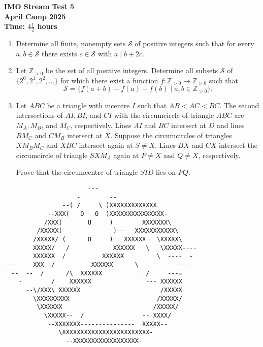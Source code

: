 \documentclass[12pt]{article}
\begin{document}
\thispagestyle{empty}

\begin{center}
  \bfseries
  \Large IMO Stream Test 5
  \\ \bigskip
  \large April Camp 2025
  \\ \bigskip
  Time: $4\frac{1}{2}$ hours
\end{center}

\bigskip\bigskip
\begin{enumerate}[leftmargin=0pt,itemsep=\bigskipamount]

\item Determine all finite, nonempty sets $\mathcal{S}$ of positive integers such that for every $a,b\in\mathcal{S}$ there exists $c\in\mathcal{S}$ with $a \mid b+ 2c$.

\item Let $\mathbb{Z}_{>0}$ be the set of all positive integers.
Determine all subsets $\mathcal{S}$ of $\{2^0, 2^1, 2^2, \dotsc\}$ for which there exist a function $f : \mathbb{Z}_{>0} \to \mathbb{Z}_{>0}$ such that
\[\mathcal{S} = \{f(a+b)-f(a)-f(b) \mid a,b\in\mathbb{Z}_{>0}\}.\]

\item 
Let $ABC$ be a triangle with incentre $I$ such that $AB<AC<BC$.
The second intersections of $AI, BI$, and $CI$ with the circumcircle of triangle $ABC$ are $M_A, M_B$, and $M_C$, respectively.
Lines $AI$ and $BC$ intersect at $D$ and lines $BM_C$ and $CM_B$ intersect at $X$.
Suppose the circumcircles of triangles $XM_BM_C$ and $XBC$ intersect again at $S\neq X$.
Lines $BX$ and $CX$ intersect the circumcircle of triangle $SXM_A$ again at $P\neq X$ and $Q\neq X$, respectively.

Prove that the circumcentre of triangle $SID$ lies on $PQ$.

\end{enumerate}


\vfill
\centering
\scriptsize %
\begin{BVerbatim}
                       ---                                     
                    -        --                             
                --( /     \ )XXXXXXXXXXXXX                   
            --XXX(   O   O  )XXXXXXXXXXXXXXX-              
           /XXX(       U     )        XXXXXXX\               
         /XXXXX(              )--   XXXXXXXXXXX\             
        /XXXXX/ (      O     )   XXXXXX   \XXXXX\
        XXXXX/   /            XXXXXX   \   \XXXXX----        
        XXXXXX  /          XXXXXX         \  ----  -         
---     XXX  /          XXXXXX      \           ---        
  --  --  /      /\  XXXXXX            /     ---=         
    -        /    XXXXXX              '--- XXXXXX         
      --\/XXX\ XXXXXX                      /XXXXX         
        \XXXXXXXXX                        /XXXXX/
         \XXXXXX                         /XXXXX/         
           \XXXXX--  /                -- XXXX/       
            --XXXXXXX---------------  XXXXX--         
               \XXXXXXXXXXXXXXXXXXXXXXXX-            
                 --XXXXXXXXXXXXXXXXXX-
\end{BVerbatim}
\end{document}
